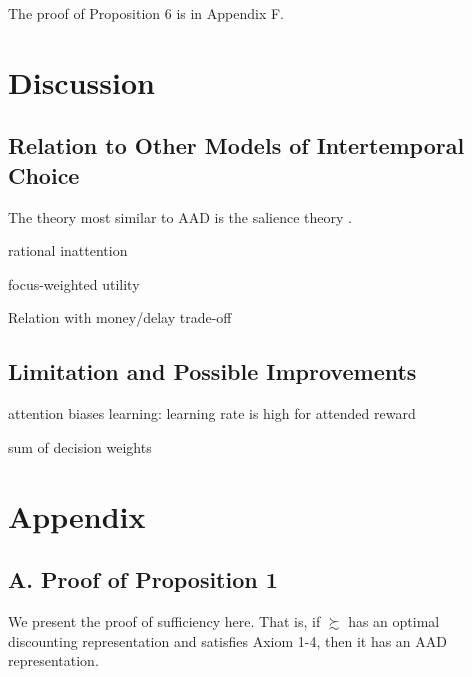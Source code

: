 \documentclass[
  12pt,
]{article}
\begin{document}
The proof of Proposition 6 is in Appendix F.

\hypertarget{discussion}{%
\section{Discussion}\label{discussion}}

\hypertarget{relation-to-other-models-of-intertemporal-choice}{%
\subsection{Relation to Other Models of Intertemporal
Choice}\label{relation-to-other-models-of-intertemporal-choice}}

The theory most similar to AAD is the salience theory
\citep{bordalo2012salience, bordalo2013salience, bordalo2020memory}.

rational inattention

focus-weighted utility

Relation with money/delay trade-off

\hypertarget{limitation-and-possible-improvements}{%
\subsection{Limitation and Possible
Improvements}\label{limitation-and-possible-improvements}}

attention biases learning: learning rate is high for attended reward

sum of decision weights

\renewcommand\refname{Reference}
  

\newpage

\hypertarget{appendix}{%
\section*{Appendix}\label{appendix}}

\hypertarget{a.-proof-of-proposition-1}{%
\subsection*{A. Proof of Proposition
1}\label{a.-proof-of-proposition-1}}

We present the proof of sufficiency here. That is, if \(\succsim\) has
an optimal discounting representation and satisfies Axiom 1-4, then it
has an AAD representation.
\end{document}
